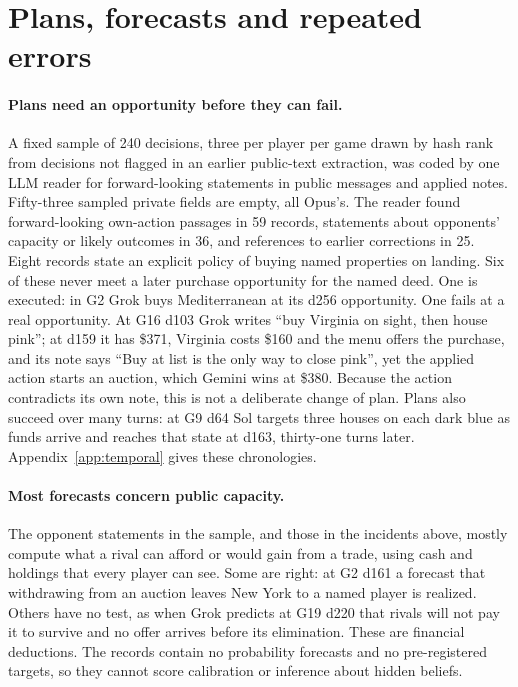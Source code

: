 \section{Plans, forecasts and repeated errors}
\label{sec:temporal}

\paragraph{Plans need an opportunity before they can fail.} A fixed sample of 240 decisions, three per player per game drawn by hash rank from decisions not flagged in an earlier public-text extraction, was coded by one LLM reader for forward-looking statements in public messages and applied notes. Fifty-three sampled private fields are empty, all Opus's. The reader found forward-looking own-action passages in 59 records, statements about opponents' capacity or likely outcomes in 36, and references to earlier corrections in 25. Eight records state an explicit policy of buying named properties on landing. Six of these never meet a later purchase opportunity for the named deed. One is executed: in G2 Grok buys Mediterranean at its d256 opportunity. One fails at a real opportunity. At G16 d103 Grok writes ``buy Virginia on sight, then house pink''; at d159 it has \$371, Virginia costs \$160 and the menu offers the purchase, and its note says ``Buy at list is the only way to close pink'', yet the applied action starts an auction, which Gemini wins at \$380. Because the action contradicts its own note, this is not a deliberate change of plan. Plans also succeed over many turns: at G9 d64 Sol targets three houses on each dark blue as funds arrive and reaches that state at d163, thirty-one turns later. Appendix~\ref{app:temporal} gives these chronologies.

\paragraph{Most forecasts concern public capacity.} The opponent statements in the sample, and those in the incidents above, mostly compute what a rival can afford or would gain from a trade, using cash and holdings that every player can see. Some are right: at G2 d161 a forecast that withdrawing from an auction leaves New York to a named player is realized. Others have no test, as when Grok predicts at G19 d220 that rivals will not pay it to survive and no offer arrives before its elimination. These are financial deductions. The records contain no probability forecasts and no pre-registered targets, so they cannot score calibration or inference about hidden beliefs.

